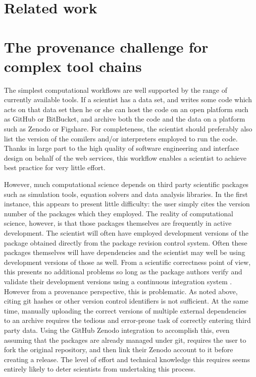 \documentclass[a4paper,11pt]{article}
\begin{document}
\section{Related work}


\section{The provenance challenge for complex tool chains}

The simplest computational workflows are well supported by the range of
currently available tools. If a scientist has a data set, and writes some
code which acts on that data set then he or she can host the code on an open
platform such as GitHub or BitBucket, and archive both the code and the data
on a platform such as Zenodo or Figshare. For completeness, the scientist
should preferably also list the version of the comilers and/or interpreters
employed to run the code. Thanks in large part to the high quality of
software engineering and interface design on behalf of the web services,
this workflow enables a scientist to achieve best practice for very little
effort. 

However, much computational science depends on third party scientific
packages such as simulation tools, equation solvers and data analysis
libraries. In the first instance, this appears to present little difficulty:
the user simply cites the version number of the packages which they
employed. The reality of computational science, however, is that those
packages themselves are frequently in active development. The scientist will
often have employed development versions of the package obtained directly
from the package revision control system. Often these packages themselves
will have dependencies and the scientist may well be using development
versions of those as well. From a scientific correctness point of view, this
presents no additional problems so long as the package authors verify and
validate their development versions using a continuous integration
system \parencite[see, for example][]{Farrell2009}. However from a
provenance perspective, this is problematic. As noted above, citing git
hashes or other version control identifiers is not sufficient. At the same
time, manually uploading the correct versions of multiple external
dependencies to an archive requires the tedious and error-prone task of
correctly entering third party data. Using the GitHub Zenodo integration to
accomplish this, even assuming that the packages are already managed under
git, requires the user to fork the original repository, and then link their
Zenodo account to it before creating a release. The level of effort and
technical knowledge this requires seems entirely likely to deter scientists
from undertaking this process.
\end{document}
